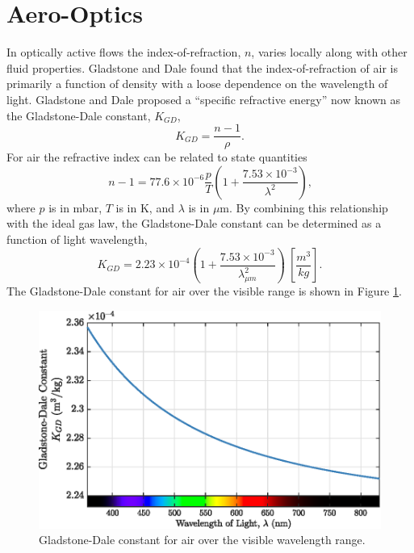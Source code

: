 \section{Aero-Optics}
In optically active flows the index-of-refraction, $n$, varies locally along with other fluid properties.
Gladstone and Dale \cite{Gladstone-1863-ND4wtDT9} found that the index-of-refraction of air is primarily a function of density with a loose dependence on the wavelength of light.
Gladstone and Dale proposed a ``specific refractive energy'' now known as the Gladstone-Dale constant, $K_{GD}$,
\begin{equation}
  K_{GD} = \frac{n-1}{\rho}\textrm{.}
  \label{eqn:02_gladstone_dale_constant}
\end{equation}
For air the refractive index can be related to state quantities \cite{Valley-1965-F3k3cmv6}
\begin{equation}
  n-1 = 77.6\times 10^{-6}\frac{p}{T}\left(1+\frac{7.53\times10^{-3}}{\lambda^2}\right)\textrm{,}
  \label{eqn:02_refractive_index_ptlambda}
\end{equation}
where $p$ is in mbar, $T$ is in K, and $\lambda$ is in $\mu$m.
By combining this relationship with the ideal gas law, the Gladstone-Dale constant can be determined as a function of light wavelength,
\begin{equation}
  K_{GD} = 2.23\times10^{-4}\left(1+\frac{7.53\times10^{-3}}{\lambda_{\mu m}^2}\right) \: \left[\frac{m^3}{kg}\right]\textrm{.}
  \label{eqn:02_gladstone_dale_wavelength}
\end{equation}
The Gladstone-Dale constant for air over the visible range is shown in Figure \ref{fig:02_gladstone_dale_wavelength}.
\begin{figure}
  \centering
  \includegraphics{../matlab/02_background/gladstone_dale_wavelength.eps}
  \caption{Gladstone-Dale constant for air over the visible wavelength range.}
  \label{fig:02_gladstone_dale_wavelength}
\end{figure}
